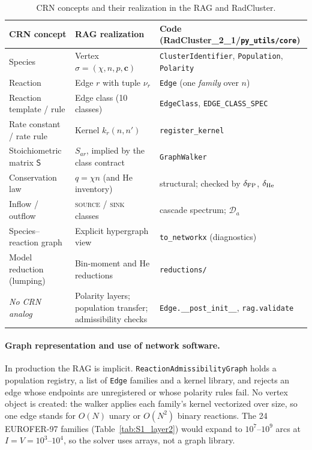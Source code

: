 \begin{table}[t]
\centering
\caption{CRN concepts and their realization in the RAG and RadCluster.}
\label{tab:S1_crn}
\small
\begin{tabularx}{\textwidth}{@{}p{}p{}X@{}}
\toprule
CRN concept & RAG realization & Code (RadCluster\_2\_1/\texttt{py\_utils/core}) \\
\midrule
Species & Vertex $\sigma=(\chi,n,p,\mathbf{c})$ & \texttt{ClusterIdentifier}, \texttt{Population}, \texttt{Polarity} \\
Reaction & Edge $r$ with tuple $\nu_r$ & \texttt{Edge} (one \emph{family} over $n$) \\
Reaction template / rule & Edge class (10 classes) & \texttt{EdgeClass}, \texttt{EDGE\_CLASS\_SPEC} \\
Rate constant / rate rule & Kernel $k_r(n,n')$ & \texttt{register\_kernel} \\
Stoichiometric matrix $\mathsf{S}$ & $S_{ar}$, implied by the class contract & \texttt{GraphWalker} \\
Conservation law & $q=\chi n$ (and He inventory) & structural; checked by $\delta_{\rm FP}$, $\delta_{\rm He}$ \\
Inflow / outflow & \textsc{source} / \textsc{sink} classes & cascade spectrum; $\mathcal{D}_a$ \\
Species--reaction graph & Explicit hypergraph view & \texttt{to\_networkx} (diagnostics) \\
Model reduction (lumping) & Bin-moment and He reductions & \texttt{reductions/} \\
\emph{No CRN analog} & Polarity layers; population transfer; admissibility checks & \texttt{Edge.\_\_post\_init\_\_}, \texttt{rag.validate} \\
\bottomrule
\end{tabularx}
\end{table}

\paragraph{Graph representation and use of network software.}
In production the RAG is implicit. \texttt{ReactionAdmissibilityGraph}
holds a population registry, a list of \texttt{Edge} families and a kernel
library, and rejects an edge whose endpoints are unregistered or whose
polarity rules fail. No vertex object is created: the walker applies each
family's kernel vectorized over size, so one edge stands for $O(N)$ unary
or $O(N^2)$ binary reactions. The 24 EUROFER-97 families
(Table~\ref{tab:S1_layer2}) would expand to $10^7$--$10^9$ arcs at
$I=V=10^3$--$10^4$, so the solver uses arrays, not a graph library.

